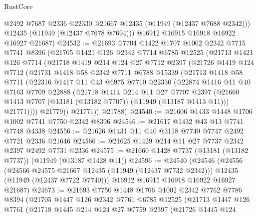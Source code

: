 \begin{lexlean}{RustCore}
\begin{coremodule}
          @2492
          @7687
          @2336
          @22330
          @21667
          @12435
          (@11949 (@12437 @7688 @2342)))
        @12435
        (@11949 (@12437 @7678 @7694)))
      @16912
      @16915
      @16918
      @16922
      @16927
      @21687)
@24532 := @21693
    @7704
    @1422
    @1707
    @1002
    @2342
    @7715
    @7741
    @8396
    (@21705
      @1421
      @126
      @2342
      @7714
      @6785
      @12525
      (@21713
        @1421
        @126
        @7714
        (@21718
          @1419
          @214
          @124
          @27
          @7712
          @2397
          (@21726
            @1419
            @124
            @7712
            (@21731
              @1418
              @58
              @2342
              @7711
              @6788
              @15339
              (@21713
                @1418
                @58
                @7711
                (@22316
                  @1417
                  @11
                  @43
                  @6975
                  @7710
                  @22330
                  (@22874
                    @1416
                    @11
                    @40
                    @7163
                    @7709
                    @22888
                    (@21718
                      @1414
                      @214
                      @11
                      @27
                      @7707
                      @2397
                      (@21660 @1413 @7707 (@13181 (@13182 @7707)) (@11949 (@13187 @1413 @11)))
                      @21771))))
              @21779))
          @21771))
      @21788)
@24540 := @21606 @1433 @1448 @1706 @1002 @7741 @7750 @2342 @8396
@24546 := @21617 @1432 @43 @13 @7741 @7748 @4338
@24556 := @21626 @1431 @11 @40 @3118 @7740 @7747 @2492 @7721 @2336 @21646
@24566 := @21625 @1429 @214 @11 @27 @7737 @2342 @2397 @2492 @7731 @2336
@24575 := @21660 @1428 @7737 (@13181 (@13182 @7737)) (@11949 (@13187 @1428 @11))
@24596 := @24540
    (@24546
      (@24556
        (@24566 @24575 @21667 @12435 (@11949 (@12437 @7732 @2342)))
        @12435
        (@11949 (@12437 @7722 @7740)))
      @16912
      @16915
      @16918
      @16922
      @16927
      @21687)
@24673 := @21693
    @7750
    @1448
    @1706
    @1002
    @2342
    @7762
    @7786
    @8394
    (@21705
      @1447
      @126
      @2342
      @7761
      @6785
      @12525
      (@21713
        @1447
        @126
        @7761
        (@21718
          @1445
          @214
          @124
          @27
          @7759
          @2397
          (@21726
            @1445
            @124

\end{coremodule}
\end{lexlean}
